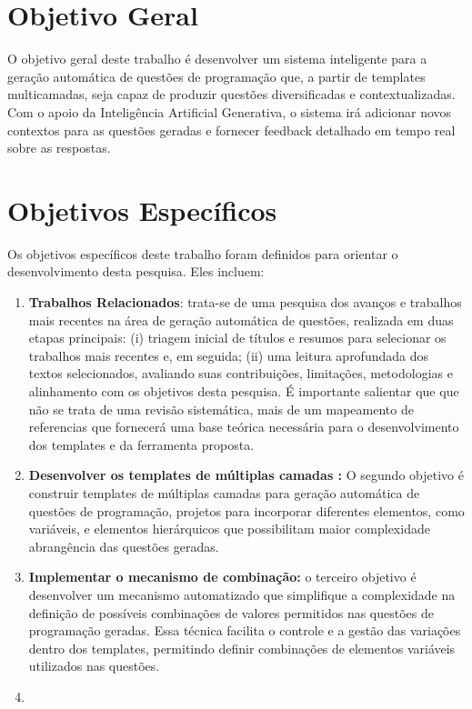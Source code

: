 \section{Objetivo Geral}

O objetivo geral deste trabalho é desenvolver um sistema inteligente para a geração automática de questões de programação que, a partir de templates multicamadas, seja capaz de produzir questões diversificadas e contextualizadas. Com o apoio da Inteligência Artificial Generativa, o sistema irá adicionar novos contextos para as questões geradas e fornecer feedback detalhado em tempo real sobre as respostas.

\section{Objetivos Específicos}

Os objetivos específicos deste trabalho foram definidos para orientar o desenvolvimento desta pesquisa. Eles incluem:

\begin{enumerate}[label=\textbf{\alph*)}]
    \item \textbf{Trabalhos Relacionados}: trata-se de uma pesquisa dos avanços e trabalhos mais recentes na área de geração automática de questões, realizada em duas etapas principais:
(i) triagem inicial de títulos e resumos para selecionar os trabalhos mais recentes e, em seguida;
(ii) uma leitura aprofundada dos textos selecionados, avaliando suas contribuições, limitações,
metodologias e alinhamento com os objetivos desta pesquisa. 
É importante salientar que que não se trata de uma revisão sistemática, mais de um mapeamento de referencias que fornecerá uma base teórica necessária para o desenvolvimento dos templates e da ferramenta proposta.
    \item \textbf{Desenvolver os templates de múltiplas camadas :}  O segundo objetivo é construir templates de múltiplas camadas para geração automática de questões de programação, projetos para incorporar diferentes elementos, como variáveis, e elementos hierárquicos que possibilitam maior complexidade abrangência das questões geradas. 
    \item \textbf{Implementar o mecanismo de combinação:} o terceiro objetivo é desenvolver um mecanismo automatizado que simplifique a complexidade na definição de possíveis combinações de valores permitidos nas questões de programação geradas. Essa técnica facilita o controle e a gestão das variações dentro dos templates, permitindo definir combinações de elementos variáveis utilizados nas questões.
    \item 
\end{enumerate}


